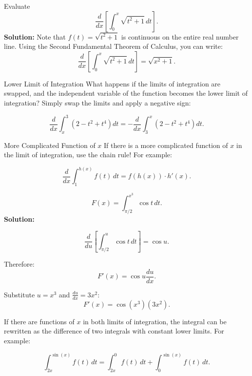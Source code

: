 \documentclass[12pt]{article}
\theoremstyle{beautifulthm}
\begin{document}
\begin{tcolorbox}[colback=examplebg, colframe=red!75!black, title=\textbf{EXAMPLE 1:  Fundamental Theorem of Calculus}, fonttitle=\bfseries, sharp corners]
Evaluate 
\[
\frac{d}{dx} \left[ \int_0^x \sqrt{t^2 + 1} \, dt \right].
\]
\tcblower
\textbf{Solution:} 
Note that \( f(t) = \sqrt{t^2 + 1} \) is continuous on the entire real number line. Using the Second Fundamental Theorem of Calculus, you can write:
\[
\frac{d}{dx} \left[ \int_0^x \sqrt{t^2 + 1} \, dt \right] = \sqrt{x^2 + 1}.
\]


\end{tcolorbox}

\newpage

\begin{Note}{Lower Limit of Integration}{}
What happens if the limits of integration are swapped, and the independent variable of the function becomes the lower limit of integration?
\vspace{5mm}
Simply swap the limits and apply a negative sign:

\[
\frac{d}{dx} \int_x^3 \left( 2 - t^2 + t^4 \right) dt = -\frac{d}{dx} \int_3^x \left( 2 - t^2 + t^4 \right) dt.
\]

\end{Note}

\begin{Note}{More Complicated Function of \(x\)}{}
 If there is a more complicated function of \(x\) in the limit of integration, use the chain rule! For example:

\[
\frac{d}{dx} \int_1^{h(x)} f(t) \, dt = f(h(x)) \cdot h'(x).
\]   
\end{Note}


\begin{tcolorbox}[colback=examplebg, colframe=red!75!black, title=\textbf{EXAMPLE 2: Fundamental Theorem of Calculus}, fonttitle=\bfseries, sharp corners]
\[
F(x) = \int_{\pi/2}^{x^3} \cos t \, dt.
\]
\tcblower
\textbf{Solution:} 

\[
\frac{d}{du} \left[ \int_{\pi/2}^u \cos t \, dt \right] = \cos u.
\]

\noindent Therefore:
\[
F'(x) = \cos u \frac{du}{dx}.
\]

\noindent Substitute \( u = x^3 \) and \( \frac{du}{dx} = 3x^2 \):
\[
F'(x) = \cos(x^3)(3x^2).
\]



\end{tcolorbox}


\newpage
\begin{Note}{}{}
If there are functions of \(x\) in both limits of integration, the integral can be rewritten as the difference of two integrals with constant lower limits. For example:

\[
\int_{2x}^{\sin(x)} f(t) \, dt = \int_{2x}^{0} f(t) \, dt + \int_{0}^{\sin(x)} f(t) \, dt.
\]
\end{Note}
\end{document}
